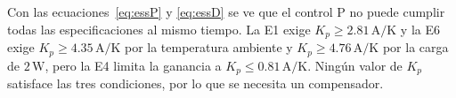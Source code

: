 Con las ecuaciones~\eqref{eq:essP} y \eqref{eq:essD} se ve que el control P no puede cumplir todas las especificaciones al mismo tiempo. La E1 exige $K_p\ge2.81\,\mathrm{A/K}$ y la E6 exige $K_p\ge4.35\,\mathrm{A/K}$ por la temperatura ambiente y $K_p\ge4.76\,\mathrm{A/K}$ por la carga de $2\,\mathrm W$, pero la E4 limita la ganancia a $K_p\le0.81\,\mathrm{A/K}$. Ningún valor de $K_p$ satisface las tres condiciones, por lo que se necesita un compensador.
